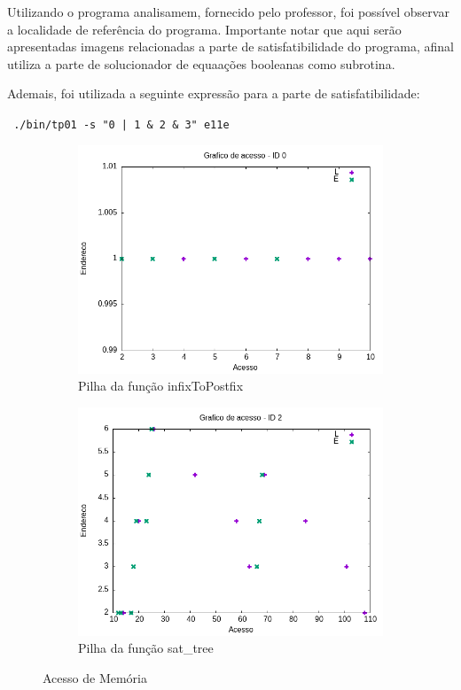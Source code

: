 \documentclass{article}
\begin{document}
Utilizando o programa analisamem, fornecido pelo professor, foi possível observar a localidade de referência do programa. Importante notar que aqui serão apresentadas imagens relacionadas a parte de satisfatibilidade do programa, afinal utiliza a parte de solucionador de equaações booleanas como subrotina.


Ademais, foi utilizada a seguinte expressão para a parte de satisfatibilidade:

\verb# ./bin/tp01 -s "0 | 1 & 2 & 3" e11e#

\begin{figure}[H]
    \centering
    \hfill
    \begin{subfigure}[c]{0.4\textwidth}
        \centering
        \includegraphics[width=\textwidth]{./images/sat_tree/registro_s-acesso-0.png}
        \caption{Pilha da função infixToPostfix}
        \label{fig:ac01}
    \end{subfigure}%
    \hfill
    \begin{subfigure}[c]{0.4\linewidth}
        
        \centering
        \includegraphics[width=\textwidth]{./images/sat_tree/registro_s-acesso-2.png}
        \caption{Pilha da função sat\_tree}
        \label{fig:ac02}
    \end{subfigure}
    \hfill
    \caption{Acesso de Memória}
\end{figure}
\end{document}
